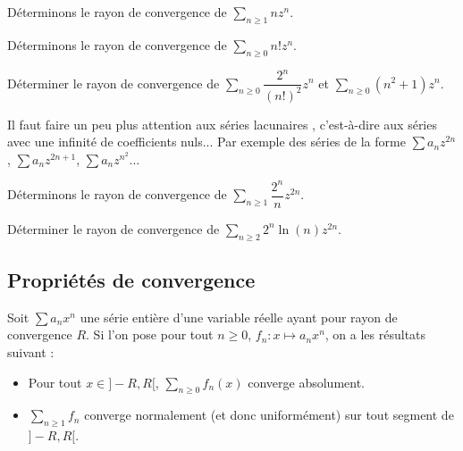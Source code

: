 \documentclass[french,11pt,twoside]{VcCours}
\begin{document}
%

\begin{Exemple}{} Déterminons le rayon de convergence de $\sum_{n \geq 1} n z^n$.

\vspace{4cm}
\end{Exemple}

\begin{Exemple}{} Déterminons le rayon de convergence de $\sum_{n \geq 0} n! z^n$.

\vspace{4cm}
\end{Exemple}

\begin{ApplicationDirecte}{} Déterminer le rayon de convergence de $\sum_{n \geq 0} \dfrac{2^n}{(n!)^2}z^n$ et $\sum_{n \geq 0} (n^2+1)z^n$.
\end{ApplicationDirecte}

\begin{Remarque}[\alerte]{} Il faut faire un peu plus attention aux séries \og lacunaires \fg, c'est-à-dire aux séries avec une infinité de coefficients nuls... Par exemple des séries de la forme $\sum a_n z^{2n}$, $\sum a_n z^{2n+1}$, $\sum a_n z^{n^2}$... 
%
\end{Remarque}

\begin{Exemple}{} Déterminons le rayon de convergence de $\sum_{n \geq 1} \dfrac{2^n}{n} z^{2n}$.

\vspace{5.5cm}
\end{Exemple}

\begin{ApplicationDirecte}{} Déterminer le rayon de convergence de $\sum_{n \geq 2} 2^n \ln(n) z^{2n}$.
\end{ApplicationDirecte}

\subsection{Propriétés de convergence}
\begin{Proposition}{} Soit $\sum a_n x^n$ une série entière d'une variable réelle ayant pour rayon de convergence $R$. Si l'on pose pour tout $n \geq 0$, $f_n : x \mapsto a_n x^n$, on a les résultats suivant :
\begin{itemize}
\item Pour tout $x \in ]-R,R[$, $\sum_{n \geq 0} f_n(x)$ converge absolument.
\item $\sum_{n \geq 1} f_n$ converge normalement (et donc uniformément) sur tout segment de $]-R,R[$.
\end{itemize}
\end{Proposition}
\end{document}
